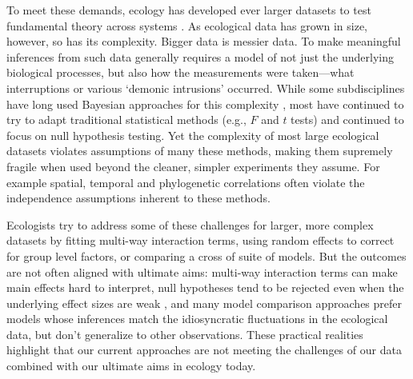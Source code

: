 \documentclass[11pt]{article}
\begin{document}
{To meet these demands, ecology has developed ever larger datasets to test fundamental theory across systems \citep{Hampton2013}. As ecological data has grown in size, however, so has its complexity. Bigger data is messier data. To make meaningful inferences from such data generally requires a model of not just the underlying biological processes, but also how the measurements were taken---what interruptions or various `demonic intrusions' \citep{Hurlbert:1984br} occurred. While some subdisciplines have long used Bayesian approaches for this complexity  \citep[generally in fields focused on inferring population sizes of things people want to eat or manage,][]{millar200,0muthuku2008,zheng2007,trijoulet2018,strinella2020potential}, most have continued to try to adapt traditional statistical methods (e.g., $F$ and $t$ tests) and continued to focus on null hypothesis testing. Yet the complexity of most large ecological datasets violates assumptions of many these methods, making them supremely fragile when used beyond the cleaner, simpler experiments they assume. For example spatial, temporal and phylogenetic correlations often violate the independence assumptions inherent to these methods.

Ecologists try to address some of these challenges for larger, more complex datasets by fitting multi-way interaction terms, using random effects to correct for group level factors, or comparing a cross of suite of models. But the outcomes are not often aligned with ultimate aims:  multi-way interaction terms can make main effects hard to interpret, null hypotheses tend to be rejected even when the underlying effect sizes are weak \citep{gelmanhill,muff2022rewriting}, and many model comparison approaches prefer models whose inferences match the idiosyncratic fluctuations in the ecological data, but don’t generalize to other observations. These practical realities highlight that our current approaches are not meeting the challenges of our data combined with our ultimate aims in ecology today.

}
\end{document}
